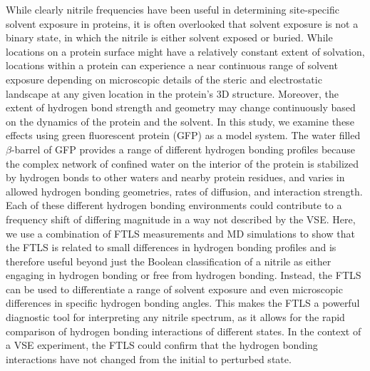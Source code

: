 While clearly nitrile frequencies have been useful in determining site-specific solvent exposure in proteins, it is often overlooked that solvent exposure is not a binary state, in which the nitrile is either solvent exposed or buried.
While locations on a protein surface might have a relatively constant extent of solvation, locations within a protein can experience a near continuous range of solvent exposure depending on microscopic details of the steric and electrostatic landscape at any given location in the protein's 3D structure.
Moreover, the extent of hydrogen bond strength and geometry may change continuously based on the dynamics of the protein and the solvent.
In this study, we examine these effects using green fluorescent protein (GFP) as a model system.
The water filled $\beta$-barrel of GFP provides a range of different hydrogen bonding profiles because the complex network of confined water on the interior of the protein is stabilized by hydrogen bonds to other waters and nearby protein residues, and varies in allowed hydrogen bonding geometries, rates of diffusion, and interaction strength.
Each of these different hydrogen bonding environments could contribute to a frequency shift of differing magnitude in a way not described by the VSE.
Here, we use a combination of FTLS measurements and MD simulations to show that the FTLS is related to small differences in hydrogen bonding profiles and is therefore useful beyond just the Boolean classification of a nitrile as either engaging in hydrogen bonding or free from hydrogen bonding.
Instead, the FTLS can be used to differentiate a range of solvent exposure and even microscopic differences in specific hydrogen bonding angles.
This makes the FTLS a powerful diagnostic tool for interpreting any nitrile spectrum, as it allows for the rapid comparison of hydrogen bonding interactions of different states.
In the context of a VSE experiment, the FTLS could confirm that the hydrogen bonding interactions have not changed from the initial to perturbed state. 


